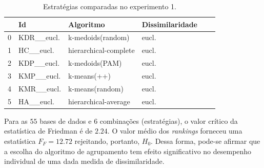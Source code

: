 \begin{table}
	\centering	
	\begin{tabular}{llllll}
		\toprule
		{} &          Id &              Algoritmo & Dissimilaridade \\
		\midrule
		0 &  KDR\_\_eucl. &       k-medoids(random) &              eucl.\\
		1 &   HC\_\_eucl. &  hierarchical-complete &               eucl. \\
		2 &  KDP\_\_eucl. &              k-medoids(PAM) &               eucl. \\
		3 &  KMP\_\_eucl. &              k-means(++) &            eucl. \\
		4 &  KMR\_\_eucl. &                k-means(random) &               eucl. \\
		5 &   HA\_\_eucl. &   hierarchical-average &          eucl. \\
		\bottomrule
	\end{tabular}
	\caption{Estratégias comparadas no experimento 1.}  \label{tbl:1}
\end{table}

Para as $55$ bases de dados e $6$ combinações (estratégias), o valor 
crítico da estatística de Friedman é de $2.24$. O valor médio dos 
\textit{rankings} forneceu uma estatística $F_F = 12.72$ rejeitando, portanto, $H_0$. 
Dessa forma, pode-se afirmar que a escolha do algoritmo de agrupamento 
tem efeito significativo no desempenho individual de uma dada medida de dissimilaridade. 

